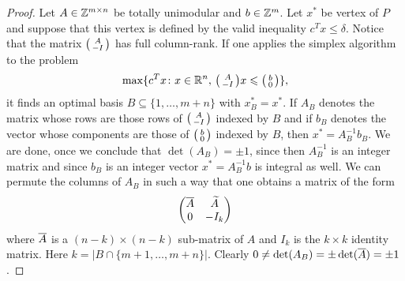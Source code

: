 \begin{proof}
  Let $A\in \mathbb{Z}^{m\times n}$ be totally unimodular  and $b \in \mathbb{Z}^m$. 
  Let $x^*$ be vertex of $P$ and suppose that this vertex is defined
  by the valid inequality $c^Tx \leq \delta$. Notice that the matrix $\big(\begin{smallmatrix} A \\ -I \end{smallmatrix}\big)$
  has full column-rank. If one applies the simplex algorithm to the
  problem 
  \begin{displaymath}
    \max\{c^Tx \colon x \in \mathbb{R}^n, \, \big(\begin{smallmatrix} A\\-I \end{smallmatrix}\big) x\leqslant \big(\begin{smallmatrix} b\\0 \end{smallmatrix}\big) \},
  \end{displaymath}
  it finds an optimal basis $B\subseteq\{ 1,\ldots,m+n\}$ with $x^*_B = x^*$. If
  $A_B$ denotes the matrix whose rows are those rows of $\big(\begin{smallmatrix} A \\
    -I \end{smallmatrix}\big)$ indexed by $B$ and if $b_B$ denotes the vector whose
  components are those of $\big(\begin{smallmatrix} b\\0 \end{smallmatrix}\big)$ indexed by $B$, then $x^* =
  A_B^{-1} b_B$. We are done, once we conclude that $\det(A_B) = \pm 1$,
  since then $A_B^{-1}$ is an integer matrix and since $b_B$ is an
  integer vector $x^* =  A_B^{-1} b$ is integral as well. We can
  permute the  columns of $A_B$ in such a way that one obtains a
  matrix of the form 
  \begin{displaymath}
    \begin{pmatrix}  \overline{A} & \widetilde{A} \\
      0      & - I_k \end{pmatrix}
  \end{displaymath}
  where $\overline{A}$ is a $(n-k)\times (n-k)$ sub-matrix of $A$ and $I_k$ is
  the $k\times k$ identity matrix. Here $k = | B \cap \{
  m+1,\ldots,m+n\} |$. Clearly $ 0 \neq \det(A_B) = \pm \det(\overline{A}) = \pm 1$. 


\end{proof}
